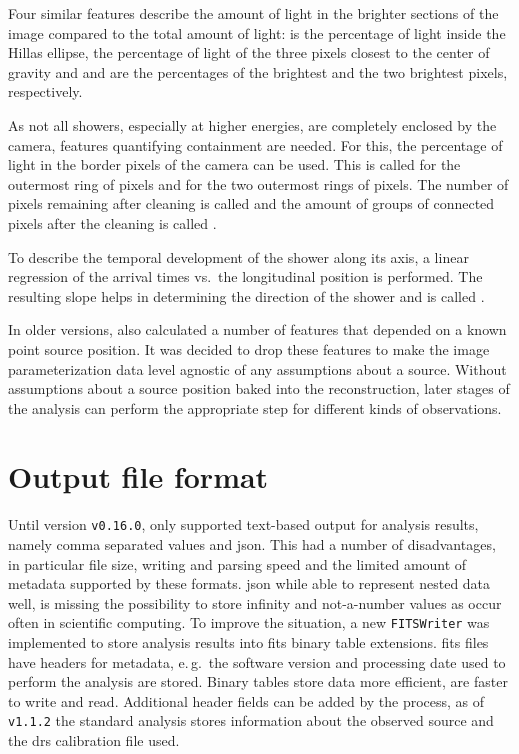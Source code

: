 Four similar features describe the amount of light in the brighter sections
of the image compared to the total amount of light:
 is the percentage of light inside
the Hillas ellipse,  the percentage of light of the three
pixels closest to the center of gravity and  and
 are the percentages of the brightest and the
two brightest pixels, respectively.

As not all showers, especially at higher energies, are completely enclosed by the camera,
features quantifying containment are needed.
For this, the percentage of light in the border pixels of the camera can be used.
This is called  for the outermost ring of pixels and  for the
two outermost rings of pixels.
The number of pixels remaining after cleaning is called 
and the amount of groups of connected pixels after the cleaning is called .

To describe the temporal development of the shower along its axis,
a linear regression of the arrival times vs.\ the longitudinal position is performed.
The resulting slope helps in determining the direction of the shower and is called .

In older versions, \facttools{} also calculated a number of features that depended
on a known point source position.
It was decided to drop these features to make the image parameterization data 
level agnostic of any assumptions about a source.
Without assumptions about a source position baked into the reconstruction,
later stages of the analysis can perform the appropriate step for different kinds of observations.


\section{Output file format}
Until version \texttt{v0.16.0}, \facttools{} only supported text-based output
for analysis results, namely comma separated values and \gls{json}.
This had a number of disadvantages, in particular file size, writing and parsing speed
and the limited amount of metadata supported by these formats.
\gls{json} while able to represent nested data well, is missing the possibility
to store infinity and not-a-number values as occur often in scientific computing.
To improve the situation, a new \texttt{FITSWriter} was implemented to store
analysis results into \gls{fits} binary table extensions.
\gls{fits} files have headers for metadata, e.\,g.\ the software version and processing
date used to perform the analysis are stored.
Binary tables store data more efficient, are faster to write and read.
Additional header fields can be added by the process, as of \texttt{v1.1.2} the standard analysis
stores information  about the observed source and the \gls{drs} calibration file used.

